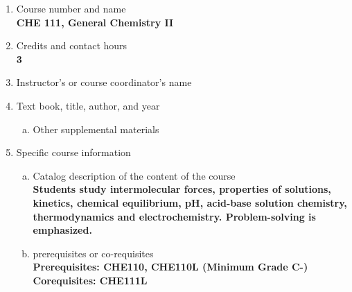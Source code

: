 \label{CHE111}  %
\begin{enumerate}[1.]
\item Course number and name\\
  {\bfseries
CHE 111, General Chemistry II
  }
  
\item Credits and contact hours\\
  {\bfseries
3    
  }

\item Instructor's or course coordinator's name\\
  {\bfseries
    
  }

\item Text book, title, author, and year\\
  {\bfseries
    
  }
\begin{enumerate}[a.]
\item Other supplemental materials\\
  {\bfseries
    
  }
\end{enumerate}

\item Specific course information
\begin{enumerate}[a.]  
\item Catalog description of the content of the course\\
  {\bfseries
Students study intermolecular forces, properties of solutions, kinetics, chemical equilibrium, pH, acid-base solution chemistry, thermodynamics and electrochemistry. Problem-solving is emphasized.
  }

\item prerequisites or co-requisites\\
  {\bfseries
    Prerequisites: CHE110, CHE110L (Minimum Grade C-)\\    
    Corequisites: CHE111L
  }


\end{enumerate}
\end{enumerate}
